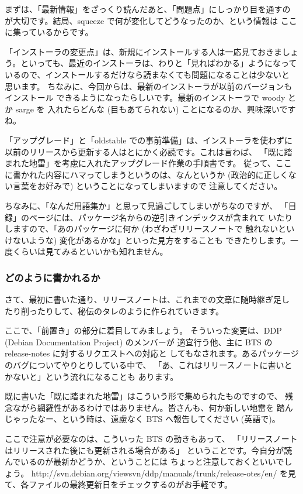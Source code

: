 \documentclass[mingoth,a4paper]{jsarticle}
\begin{document}
まずは、「最新情報」をざっくり読んだあと、「問題点」にしっかり目を通すの
が大切です。結局、squeeze で何が変化してどうなったのか、という情報は
ここに集っているからです。

「インストーラの変更点」は、新規にインストールする人は一応見ておきましょ
う。といっても、最近のインストーラは、わりと「見ればわかる」ようになって
いるので、インストールするだけなら読まなくても問題になることは少ないと
思います。
ちなみに、今回からは、最新のインストーラが以前のバージョンもインストール
できるようになったらしいです。最新のインストーラで woody とか sarge を
入れたらどんな (目もあてられない) ことになるのか、興味深いですね。

「アップグレード」と「oldstable での事前準備」は、インストーラを使わずに
以前のリリースから更新する人はとにかく必読です。これは言わば、
「既に踏まれた地雷」を考慮に入れたアップグレード作業の手順書です。
従って、ここに書かれた内容にハマってしまうというのは、なんというか
(政治的に正しくない言葉をお好みで) ということになってしまいますので
注意してください。

ちなみに、「なんだ用語集か」と思って見過ごしてしまいがちなのですが、
「目録」のページには、パッケージ名からの逆引きインデックスが含まれて
いたりしますので、「あのパッケージに何か (わざわざリリースノートで
触れないといけないような) 変化があるかな」といった見方をすることも
できたりします。一度くらいは見てみるといいかも知れません。

\subsubsection{どのように書かれるか}
さて、最初に書いた通り、リリースノートは、これまでの文章に随時継ぎ足し
たり削ったりして、秘伝のタレのように作られていきます。

ここで、「前置き」の部分に着目してみましょう。
そういった変更は、DDP (Debian Documentation Project) のメンバーが
適宜行う他、主に BTS の release-notes に対するリクエストへの対応と
してもなされます。あるパッケージのバグについてやりとりしている中で、
「あ、これはリリースノートに書いとかないと」という流れになることも
あります。

既に書いた「既に踏まれた地雷」はこういう形で集められたものですので、
残念ながら網羅性があるわけではありません。皆さんも、何か新しい地雷を
踏んじゃったなー、という時は、遠慮なく BTS へ報告してください (英語で)。

ここで注意が必要なのは、こういった BTS の動きもあって、
「リリースノートはリリースされた後にも更新される場合がある」
ということです。今自分が読んでいるのが最新かどうか、ということには
ちょっと注意しておくといいでしょう。
http://svn.debian.org/viewsvn/ddp/manuals/trunk/release-otes/en/
を見て、各ファイルの最終更新日をチェックするのがお手軽です。
\end{document}
